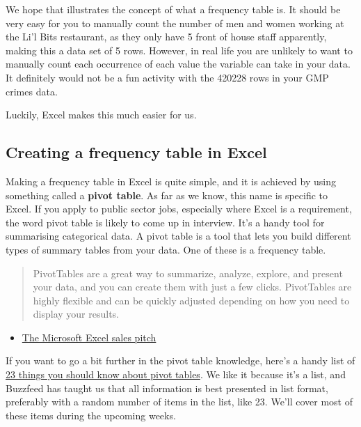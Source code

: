 \documentclass[
]{book}
\providecommand{\tightlist}{%
  \setlength{\itemsep}{0pt}\setlength{\parskip}{0pt}}
\begin{document}
We hope that illustrates the concept of what a frequency table is. It should be very easy for you to manually count the number of men and women working at the Li'l Bits restaurant, as they only have 5 front of house staff apparently, making this a data set of 5 rows. However, in real life you are unlikely to want to manually count each occurrence of each value the variable can take in your data. It definitely would not be a fun activity with the 420228 rows in your GMP crimes data.

Luckily, Excel makes this much easier for us.

\hypertarget{creating-a-frequency-table-in-excel}{%
\subsection{Creating a frequency table in Excel}\label{creating-a-frequency-table-in-excel}}

Making a frequency table in Excel is quite simple, and it is achieved by using something called a \textbf{pivot table}. As far as we know, this name is specific to Excel. If you apply to public sector jobs, especially where Excel is a requirement, the word pivot table is likely to come up in interview. It's a handy tool for summarising categorical data. A pivot table is a tool that lets you build different types of summary tables from your data. One of these is a frequency table.

\begin{quote}
PivotTables are a great way to summarize, analyze, explore, and present your data, and you can create them with just a few clicks. PivotTables are highly flexible and can be quickly adjusted depending on how you need to display your results.
\end{quote}

\begin{itemize}
\tightlist
\item
  \href{https://support.office.com/en-gb/article/Create-a-PivotTable-to-analyze-worksheet-data-a9a84538-bfe9-40a9-a8e9-f99134456576}{The Microsoft Excel sales pitch}
\end{itemize}

If you want to go a bit further in the pivot table knowledge, here's a handy list of \href{https://exceljet.net/things-to-know-about-excel-pivot-tables}{23 things you should know about pivot tables}. We like it because it's a list, and Buzzfeed has taught us that all information is best presented in list format, preferably with a random number of items in the list, like 23. We'll cover most of these items during the upcoming weeks.
\end{document}
